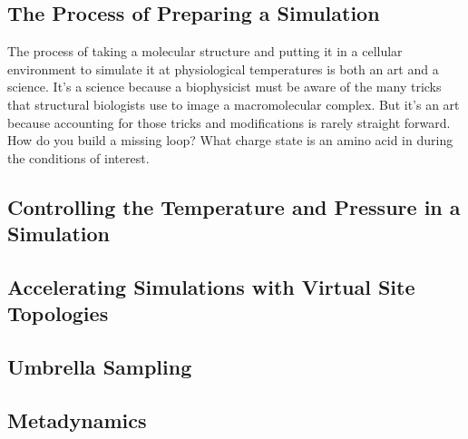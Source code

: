 \subsection{The Process of Preparing a Simulation}
The process of taking a molecular structure and putting it in a cellular environment to simulate it at physiological temperatures is both an art and a science. It's a science because a biophysicist must be aware of the many tricks that structural biologists use to image a macromolecular complex. But it's an art because accounting for those tricks and modifications is rarely straight forward. How do you build a missing loop? What charge state is an amino acid in during the conditions of interest.

\subsection{Controlling the Temperature and Pressure in a Simulation}

\subsection{Accelerating Simulations with Virtual Site Topologies}
 
\subsection{Umbrella Sampling}

\subsection{Metadynamics}
